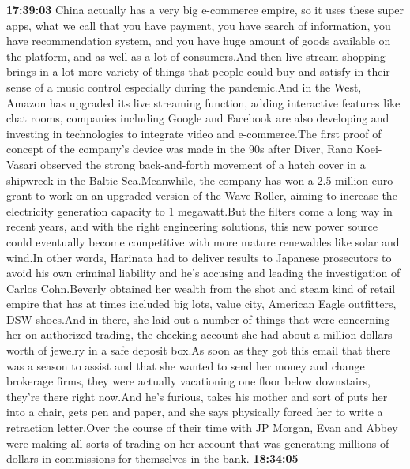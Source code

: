 \documentclass{article}%
\begin{document}
\textbf{17:39:03}%
\newline%
China actually has a very big e{-}commerce empire, so it uses these super apps, what we call that you have payment, you have search of information, you have recommendation system, and you have huge amount of goods available on the platform, and as well as a lot of consumers.And then live stream shopping brings in a lot more variety of things that people could buy and satisfy in their sense of a music control especially during the pandemic.And in the West, Amazon has upgraded its live streaming function, adding interactive features like chat rooms, companies including Google and Facebook are also developing and investing in technologies to integrate video and e{-}commerce.The first proof of concept of the company's device was made in the 90s after Diver, Rano Koei{-}Vasari observed the strong back{-}and{-}forth movement of a hatch cover in a shipwreck in the Baltic Sea.Meanwhile, the company has won a 2.5 million euro grant to work on an upgraded version of the Wave Roller, aiming to increase the electricity generation capacity to 1 megawatt.But the filters come a long way in recent years, and with the right engineering solutions, this new power source could eventually become competitive with more mature renewables like solar and wind.In other words, Harinata had to deliver results to Japanese prosecutors to avoid his own criminal liability and he's accusing and leading the investigation of Carlos Cohn.Beverly obtained her wealth from the shot and steam kind of retail empire that has at times included big lots, value city, American Eagle outfitters, DSW shoes.And in there, she laid out a number of things that were concerning her on authorized trading, the checking account she had about a million dollars worth of jewelry in a safe deposit box.As soon as they got this email that there was a season to assist and that she wanted to send her money and change brokerage firms, they were actually vacationing one floor below downstairs, they're there right now.And he's furious, takes his mother and sort of puts her into a chair, gets pen and paper, and she says physically forced her to write a retraction letter.Over the course of their time with JP Morgan, Evan and Abbey were making all sorts of trading on her account that was generating millions of dollars in commissions for themselves in the bank.%
\textbf{18:34:05}%
\newline%
\end{document}
